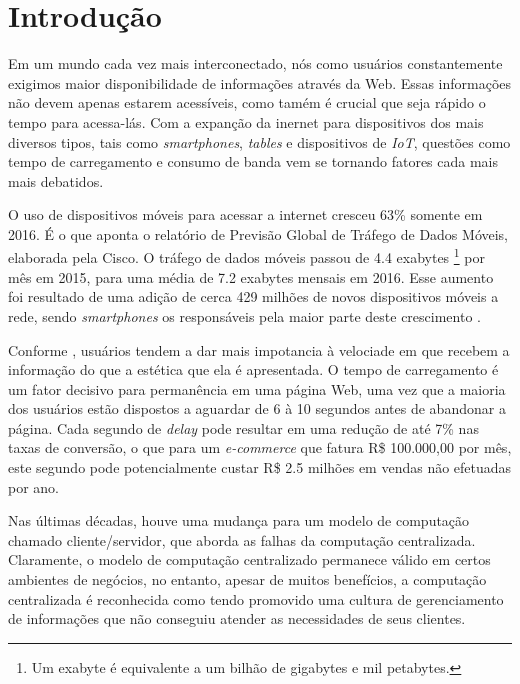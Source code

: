 \chapter[Introdução]{Introdução}


Em um mundo cada vez mais interconectado, nós como usuários constantemente exigimos maior disponibilidade de informações através da Web. Essas informações não devem apenas estarem acessíveis, como tamém é crucial que seja rápido o tempo para acessa-lás. Com a expanção da inernet para dispositivos dos mais diversos tipos, tais como \textit{smartphones}, \textit{tables} e dispositivos de \textit{IoT}, questões como tempo de carregamento e consumo de banda vem se tornando fatores cada mais mais debatidos.

O uso de dispositivos móveis para acessar a internet cresceu 63\% somente em 2016. É o que aponta o relatório de Previsão Global de Tráfego de Dados Móveis, elaborada pela Cisco. O tráfego de dados móveis passou de  4.4 exabytes \footnote{Um exabyte é equivalente a um bilhão de gigabytes e mil petabytes.} por mês em 2015, para uma média de 7.2 exabytes mensais em 2016. Esse aumento foi resultado de uma adição de cerca 429 milhões de novos dispositivos móveis a rede, sendo \textit{smartphones} os responsáveis pela maior parte deste crescimento \cite{cisco-network-report}.

Conforme , usuários tendem a dar mais impotancia à velociade em que recebem a informação do que a estética que ela é apresentada. O tempo de carregamento é um fator decisivo para permanência em uma página Web, uma vez que a maioria dos usuários estão dispostos a aguardar de 6 à 10 segundos antes de abandonar a página. Cada segundo de \textit{delay} pode resultar em uma redução de até 7\% nas taxas de conversão, o que para um \textit{e-commerce} que fatura R\$ 100.000,00 por mês, este segundo pode potencialmente custar R\$ 2.5 milhões em vendas não efetuadas por ano.

Nas últimas décadas, houve uma mudança para um modelo de computação chamado cliente/servidor, que aborda as falhas da computação centralizada. Claramente, o modelo de computação centralizado permanece válido em certos ambientes de negócios, no entanto, apesar de muitos benefícios, a computação centralizada é reconhecida como tendo promovido uma cultura de gerenciamento de informações que não conseguiu atender as necessidades de seus clientes.

